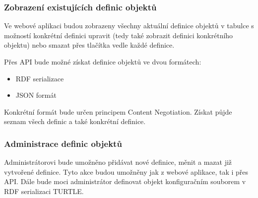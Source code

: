 \documentclass[thesis=B,czech]{FITthesis}[2012/06/26]
\begin{document}
 \subsubsection{Zobrazení existujících definic objektů}
  Ve webové aplikaci budou zobrazeny všechny aktuální definice objektů v tabulce s možností konkrétní definici upravit (tedy také zobrazit definici konkrétního objektu)
  nebo smazat přes tlačítka vedle každé definice.
  
  Přes API bude možné získat definice objektů ve dvou formátech:
  \begin{itemize}
    \item RDF serializace
    \item JSON formát
 \end{itemize}
  Konkrétní formát bude určen principem Content Negotiation. Získat půjde seznam všech definic a také konkrétní definice.
 
 \subsubsection{Administrace definic objektů}
  Administrátorovi bude umožněno přidávat nové definice, měnit a mazat již vytvořené definice. Tyto akce budou umožněny jak z webové aplikace, tak i přes API.
  Dále bude moci administrátor definovat objekt konfiguračním souborem v RDF serializaci TURTLE.
  
  
\end{document}

